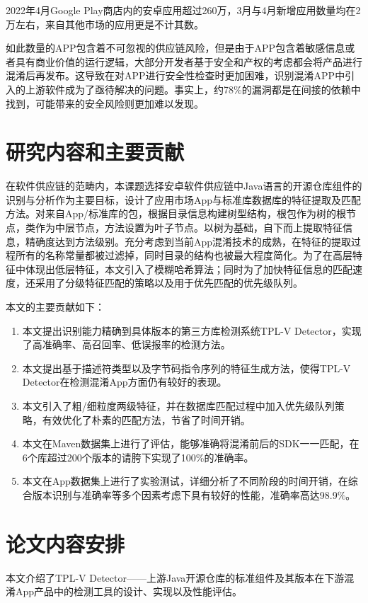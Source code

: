 2022年4月Google Play商店内的安卓应用超过260万，3月与4月新增应用数量均在2万左右，来自其他市场的应用更是不计其数。

如此数量的APP包含着不可忽视的供应链风险，但是由于APP包含着敏感信息或者具有商业价值的运行逻辑，大部分开发者基于安全和产权的考虑都会将产品进行混淆后再发布。这导致在对APP进行安全性检查时更加困难，识别混淆APP中引入的上游软件成为了亟待解决的问题。事实上，约78\%的漏洞都是在间接的依赖中找到，可能带来的安全风险则更加难以发现\cite{qianxin.com}。


\section{研究内容和主要贡献}
在软件供应链的范畴内，本课题选择安卓软件供应链中Java语言的开源仓库组件的识别与分析作为主要目标，设计了应用市场App与标准库数据库的特征提取及匹配方法。对来自App/标准库的包，根据目录信息构建树型结构，根包作为树的根节点，类作为中层节点，方法设置为叶子节点。以树为基础，自下而上提取特征信息，精确度达到方法级别。充分考虑到当前App混淆技术的成熟，在特征的提取过程所有的名称常量都被过滤掉，同时目录的结构也被最大程度简化。为了在高层特征中体现出低层特征，本文引入了模糊哈希算法；同时为了加快特征信息的匹配速度，还采用了分级特征匹配的策略以及用于优先匹配的优先级队列。

本文的主要贡献如下：

\begin{enumerate}
\item{本文提出识别能力精确到具体版本的第三方库检测系统TPL-V Detector，实现了高准确率、高召回率、低误报率的检测方法。}
\item{本文提出基于描述符类型以及字节码指令序列的特征生成方法，使得TPL-V Detector在检测混淆App方面仍有较好的表现。}
\item{本文引入了粗/细粒度两级特征，并在数据库匹配过程中加入优先级队列策略，有效优化了朴素的匹配方法，节省了时间开销。}
\item{本文在Maven数据集上进行了评估，能够准确将混淆前后的SDK一一匹配，在6个库超过200个版本的请胯下实现了100\%的准确率。}
\item{本文在App数据集上进行了实验测试，详细分析了不同阶段的时间开销，在综合版本识别与准确率等多个因素考虑下具有较好的性能，准确率高达98.9\%。}
\end{enumerate}


\section{论文内容安排}
本文介绍了TPL-V Detector——上游Java开源仓库的标准组件及其版本在下游混淆App产品中的检测工具的设计、实现以及性能评估。

